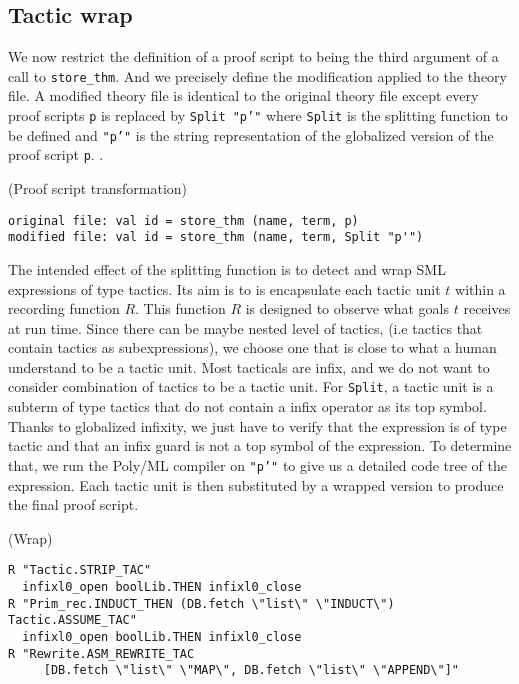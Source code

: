 \documentclass[runningheads,a4paper,draft]{svjour3}
\def\sml{\textsf{SML}\xspace}
\def\polyml{\textsf{Poly/ML}\xspace}
\begin{document}
\subsection{Tactic wrap}

We now restrict the definition of a proof script to being the third 
argument of a call to 
\texttt{store\_thm}. And we precisely define the 
modification applied to the theory file. A modified theory file is identical to 
the original theory file except every proof scripts \texttt{p} is
replaced by \texttt{Split "p'"} where \texttt{Split} is the splitting function 
to be defined and \texttt{"p'"} is the string representation of the globalized 
version of the proof script 
\texttt{p}. 
.
\begin{example}(Proof script transformation)
\begin{lstlisting}[language=SMLSmall,frame=tb]
original file: val id = store_thm (name, term, p)
modified file: val id = store_thm (name, term, Split "p'")
\end{lstlisting}
\end{example}


The intended effect of the splitting function is to detect and wrap \sml 
expressions of type tactics. Its aim is to is encapsulate each tactic 
unit $t$ within a recording function $R$. This function $R$ is designed to 
observe what goals $t$ receives at run time. Since there can be maybe nested 
level of tactics, (i.e 
tactics that contain tactics as subexpressions), we choose one that is
close to what a human understand to be a tactic unit. 
Most tacticals are infix, and we do not want to consider combination of 
tactics to be a tactic unit. For \texttt{Split}, a tactic unit is a 
subterm of 
type tactics that do not contain a infix operator as its top symbol. Thanks to
globalized infixity, we just have to verify that the expression 
is of type tactic and that an infix guard is not a top symbol of the expression.
To determine that, we run the \polyml compiler on \texttt{"p'"} to give us a 
detailed code tree of the expression. Each tactic unit is then substituted 
by a wrapped version to produce the final proof script.

\begin{example} (Wrap)
\begin{lstlisting}[language=SMLSmall,frame=tb]
R "Tactic.STRIP_TAC"
  infixl0_open boolLib.THEN infixl0_close
R "Prim_rec.INDUCT_THEN (DB.fetch \"list\" \"INDUCT\") Tactic.ASSUME_TAC"
  infixl0_open boolLib.THEN infixl0_close
R "Rewrite.ASM_REWRITE_TAC 
     [DB.fetch \"list\" \"MAP\", DB.fetch \"list\" \"APPEND\"]"
\end{lstlisting}
\end{example}   
\end{document}
